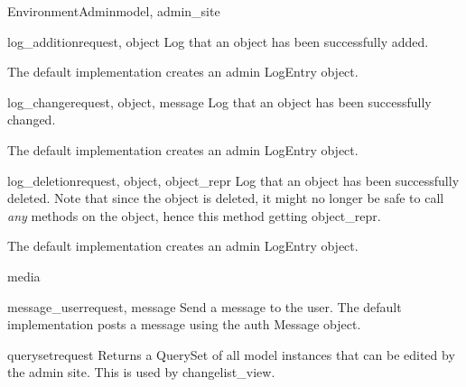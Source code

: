 \documentclass[letterpaper,10pt,english]{sphinxmanual}
\begin{document}
\begin{classdesc}{EnvironmentAdmin}{model, admin\_site}
\hypertarget{data.admin.EnvironmentAdmin.log_addition}{}\begin{methoddesc}{log\_addition}{request, object}
Log that an object has been successfully added.

The default implementation creates an admin LogEntry object.
\end{methoddesc}

\hypertarget{data.admin.EnvironmentAdmin.log_change}{}\begin{methoddesc}{log\_change}{request, object, message}
Log that an object has been successfully changed.

The default implementation creates an admin LogEntry object.
\end{methoddesc}

\hypertarget{data.admin.EnvironmentAdmin.log_deletion}{}\begin{methoddesc}{log\_deletion}{request, object, object\_repr}
Log that an object has been successfully deleted. Note that since the
object is deleted, it might no longer be safe to call \emph{any} methods
on the object, hence this method getting object\_repr.

The default implementation creates an admin LogEntry object.
\end{methoddesc}

\hypertarget{data.admin.EnvironmentAdmin.media}{}\begin{memberdesc}{media}\end{memberdesc}

\hypertarget{data.admin.EnvironmentAdmin.message_user}{}\begin{methoddesc}{message\_user}{request, message}
Send a message to the user. The default implementation
posts a message using the auth Message object.
\end{methoddesc}

\hypertarget{data.admin.EnvironmentAdmin.queryset}{}\begin{methoddesc}{queryset}{request}
Returns a QuerySet of all model instances that can be edited by the
admin site. This is used by changelist\_view.
\end{methoddesc}


\end{classdesc}
\end{document}
